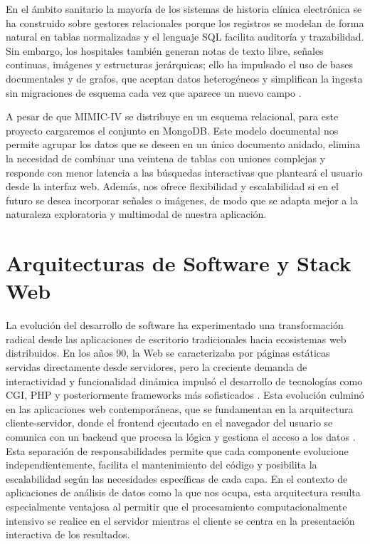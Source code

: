 En el ámbito sanitario la mayoría de los sistemas de historia clínica electrónica se ha construido sobre gestores relacionales porque los registros se modelan de forma natural en tablas normalizadas y el lenguaje SQL facilita auditoría y trazabilidad.  Sin embargo, los hospitales también generan notas de texto libre, señales continuas, imágenes y estructuras jerárquicas; ello ha impulsado el uso de bases documentales y de grafos, que aceptan datos heterogéneos y simplifican la ingesta sin migraciones de esquema cada vez que aparece un nuevo campo \cite{GAMAL2021103670,MongoFHIR}.

A pesar de que MIMIC-IV se distribuye en un esquema relacional, para este proyecto cargaremos el conjunto en MongoDB. Este modelo documental nos permite agrupar los datos que se deseen en un único documento anidado, elimina la necesidad de combinar una veintena de tablas con uniones complejas y responde con menor latencia a las búsquedas interactivas que planteará el usuario desde la interfaz web.  Además, nos ofrece flexibilidad y escalabilidad si en el futuro se desea incorporar señales o imágenes, de modo que se adapta mejor a la naturaleza exploratoria y multimodal de nuestra aplicación.


\section{Arquitecturas de Software y  Stack Web}

La evolución del desarrollo de software ha experimentado una transformación radical desde las aplicaciones de escritorio tradicionales hacia ecosistemas web distribuidos. En los años 90, la Web se caracterizaba por páginas estáticas servidas directamente desde servidores, pero la creciente demanda de interactividad y funcionalidad dinámica impulsó el desarrollo de tecnologías como CGI, PHP y posteriormente frameworks más sofisticados \cite{Ritesh2023_WebEvolution}. Esta evolución culminó en las aplicaciones web contemporáneas, que se fundamentan en la arquitectura cliente-servidor, donde el frontend ejecutado en el navegador del usuario se comunica con un backend que procesa la lógica y gestiona el acceso a los datos \cite{Nyabuto2024_ClientServer}. Esta separación de responsabilidades permite que cada componente evolucione independientemente, facilita el mantenimiento del código y posibilita la escalabilidad según las necesidades específicas de cada capa. En el contexto de aplicaciones de análisis de datos como la que nos ocupa, esta arquitectura resulta especialmente ventajosa al permitir que el procesamiento computacionalmente intensivo se realice en el servidor mientras el cliente se centra en la presentación interactiva de los resultados.

